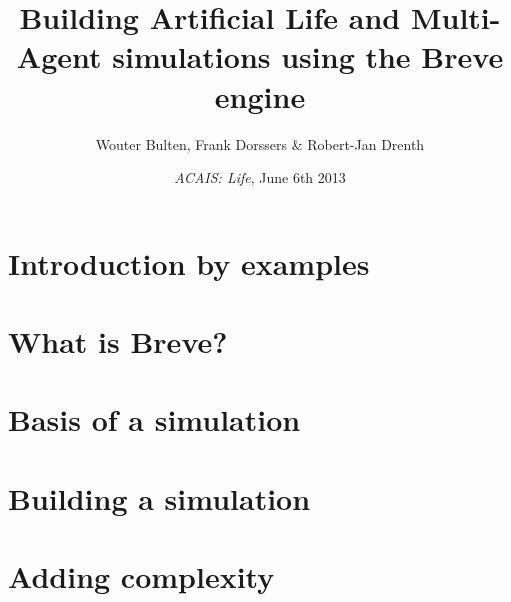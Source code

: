\documentclass{beamer}
\title{Building Artificial Life and Multi-Agent simulations using the Breve engine}
\author{Wouter Bulten, Frank Dorssers \& Robert-Jan Drenth}
\date{\textit{ACAIS: Life}, June 6th 2013}
\begin{document}
\frame{
\titlepage}

\section[Outline]{}

\section{Introduction by examples}


\section{What is Breve?}
\frame{

}

\section{Basis of a simulation}
\frame{

}

\section{Building a simulation}
\frame{

}

\section{Adding complexity}
\frame{

}
\end{document}
